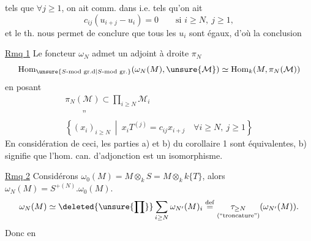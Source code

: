 tels que $\forall j\geq1$, on ait comm. dans
i.e. tels qu'on ait
\[
c_{ij}(u_{i+j}-u_i)=0\qquad\text{si }i\geq N,\ j\geq1,
\]
et le th. nous permet de conclure que tous les $u_i$ sont égaux, d'où la conclusion

\uline{Rmq 1} Le foncteur $\omega_N$ admet un adjoint à droite $\pi_N$
\[
\operatorname{Hom}_{\unsure{S\text{-mod gr.d}|S\text{-mod gr.}}}(\omega_N(M),\unsure{\mathcal M})\simeq\operatorname{Hom}_k(M,\pi_N(\mathcal M))
\]
en posant
\[
\begin{array}{l}
\pi_N(\mathcal M)\subset\displaystyle\prod_{i\geq N}\mathcal M_i\\
\qquad\text{''}\\
\displaystyle\left\{(x_i)_{i\geq N}\ \middle|\ x_iT^{(j)}=c_{ij}x_{i+j}\quad\forall i\geq N,\ j\geq1\right\}
\end{array}
\]
En considération de ceci,  les parties a) et b) du corollaire 1 sont équivalentes, b) signifie que l'hom. can. d'adjonction
est  un isomorphisme.

\uline{Rmq 2} Considérons $\omega_0(M)=M\otimes_k S=M\otimes_k k\{T\}$, alors $\omega_N(M)=S^{+(N)}.\omega_0(M)$.  
\[
\omega_N(M)\simeq\deleted{\unsure{\prod}}\sum_{i\geq N}\omega_{N'}(M)_i\overset{\mathrm{def}}=\underset{\text{(``troncature'')}}{\tau_{\geq N}}(\omega_{N'}(M)).
\]
Donc en
